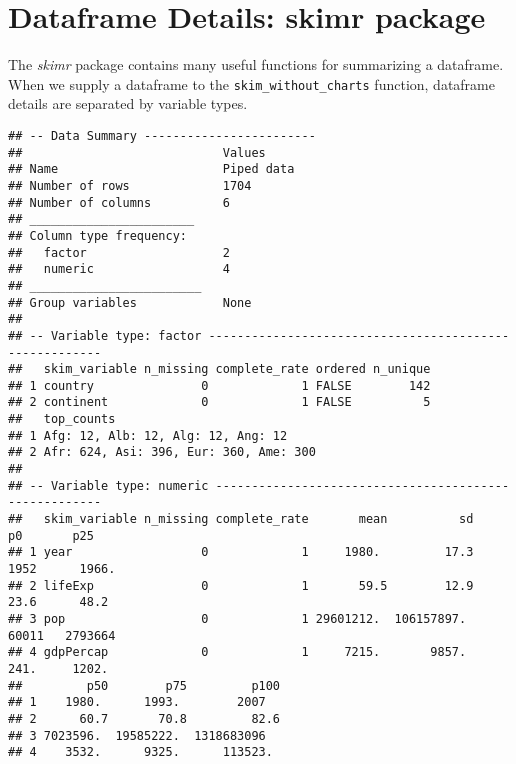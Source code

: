 \documentclass[
]{book}
\newenvironment{Shaded}{\begin{snugshade}}{\end{snugshade}}
\newcommand{\KeywordTok}[1]{\textcolor[rgb]{0.13,0.29,0.53}{\textbf{#1}}}
\newcommand{\NormalTok}[1]{#1}
\newcommand{\OperatorTok}[1]{\textcolor[rgb]{0.81,0.36,0.00}{\textbf{#1}}}
\newcommand{\StringTok}[1]{\textcolor[rgb]{0.31,0.60,0.02}{#1}}
\begin{document}
\hypertarget{dataframe-details-skimr-package}{%
\section{Dataframe Details: skimr package}\label{dataframe-details-skimr-package}}

The \emph{skimr} package contains many useful functions for summarizing a dataframe. When we supply a dataframe to the \texttt{skim\_without\_charts} function, dataframe details are separated by variable types.

\begin{Shaded}
\end{Shaded}

\begin{verbatim}
## -- Data Summary ------------------------
##                            Values    
## Name                       Piped data
## Number of rows             1704      
## Number of columns          6         
## _______________________              
## Column type frequency:               
##   factor                   2         
##   numeric                  4         
## ________________________             
## Group variables            None      
## 
## -- Variable type: factor -------------------------------------------------------
##   skim_variable n_missing complete_rate ordered n_unique
## 1 country               0             1 FALSE        142
## 2 continent             0             1 FALSE          5
##   top_counts                            
## 1 Afg: 12, Alb: 12, Alg: 12, Ang: 12    
## 2 Afr: 624, Asi: 396, Eur: 360, Ame: 300
## 
## -- Variable type: numeric ------------------------------------------------------
##   skim_variable n_missing complete_rate       mean          sd      p0       p25
## 1 year                  0             1     1980.         17.3  1952      1966. 
## 2 lifeExp               0             1       59.5        12.9    23.6      48.2
## 3 pop                   0             1 29601212.  106157897.  60011   2793664  
## 4 gdpPercap             0             1     7215.       9857.    241.     1202. 
##         p50        p75         p100
## 1    1980.      1993.        2007  
## 2      60.7       70.8         82.6
## 3 7023596.  19585222.  1318683096  
## 4    3532.      9325.      113523.
\end{verbatim}
\end{document}
